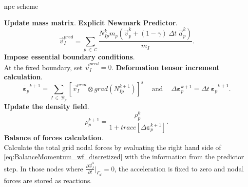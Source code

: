 \documentclass[preprint,12pt,a4paper]{elsarticle}
\newcommand{\tens}[1]{
  \ensuremath{\mathbf{{#1}}}
}
\newcommand\Grad[1]{grad({#1})}
\newcommand{\Deriv}[3][]{
  \ensuremath{\frac{\partial^{#1}{#2}}{ \partial {#3}^{#1} }}
}
\begin{document}
\begin{algorithm}
\caption{\acrfull{npc} scheme}
\label{alg:the_npc_alg}
  \begin{algorithmic}[1]
    \STATE \textbf{Update mass matrix}.
    \STATE \textbf{Explicit Newmark Predictor}.\\
    \begin{equation*}
      \vec{v}_I^{pred} = \sum_{p\ \in\ \mathcal{C}} \frac{ N_{Ip}^{k} m_p (\vec{v}_p^k + (1 - \gamma)\ \Delta t\ \vec{a}_p^k)}{m_I}.
    \end{equation*}
    \STATE \textbf{Impose essential boundary conditions}.\\
    At the fixed boundary, set $\vec{v}_{I}^{pred} = 0$. 
    \STATE \textbf{Deformation tensor increment calculation}.
    \begin{equation*}
      \dot{\tens{\varepsilon}_{p}}^{k+1} = \sum_{I\ \in\ \mathcal{B}_p} \left[ \vec{v}_{I}^{pred} \otimes \Grad{N_{Ip}^{k+1}} \right]^s\ \quad \text{and}\ \quad \Delta \tens{\varepsilon}_{p}^{k+1} = \Delta t\ \dot{\tens{\varepsilon}_{p}}^{k+1}.
    \end{equation*}
    \STATE \textbf{Update the density field}.
    \begin{equation*}
      \rho_p^{k+1} = \frac{\rho_p^k}{1 + \mathit{trace}\left[\Delta\tens{\varepsilon}_{p}^{k+1}\right]}.
    \end{equation*}
    \STATE \textbf{Balance of forces calculation}.\\
    Calculate the total grid nodal forces by evaluating the right hand side of 
    \eqref{eq:BalanceMomentum_wf_discretized} with the information from the predictor step.
    In those nodes where $\Deriv{\vec{v}_I^{k}}{t} \big\rvert_{\Gamma_d} = 0$, the acceleration is fixed to zero and nodal forces are stored as reactions.\\

\end{algorithmic}
\end{algorithm}
\end{document}
